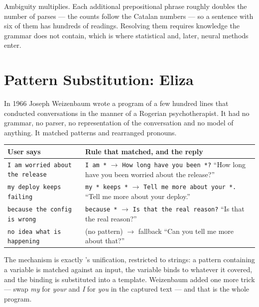 Ambiguity multiplies. Each additional prepositional phrase roughly doubles the
number of parses --- the counts follow the Catalan numbers --- so a sentence with
six of them has hundreds of readings. Resolving them requires knowledge the grammar
does not contain, which is where statistical and, later, neural methods enter.

\section{Pattern Substitution: Eliza}
\label{sec:eliza}

In 1966 Joseph Weizenbaum wrote a program of a few hundred lines that conducted
conversations in the manner of a Rogerian psychotherapist. It had no grammar, no
parser, no representation of the conversation and no model of anything. It matched
patterns and rearranged pronouns.

\begin{examplebox}
\begin{tabular}{@{}L{6.6cm}L{8.2cm}@{}}
\toprule
\textbf{User says} & \textbf{Rule that matched, and the reply} \\
\midrule
\texttt{I am worried about the release} &
\texttt{I am *} $\to$ \texttt{How long have you been *?}\newline
``How long have you been worried about the release?'' \\
\texttt{my deploy keeps failing} &
\texttt{my * keeps *} $\to$ \texttt{Tell me more about your *.}\newline
``Tell me more about your deploy.'' \\
\texttt{because the config is wrong} &
\texttt{because *} $\to$ \texttt{Is that the real reason?}\newline
``Is that the real reason?'' \\
\texttt{no idea what is happening} &
(no pattern) $\to$ fallback\newline
``Can you tell me more about that?'' \\
\bottomrule
\end{tabular}
\end{examplebox}

The mechanism is exactly 's unification, restricted to strings: a pattern
containing a variable is matched against an input, the variable binds to whatever
it covered, and the binding is substituted into a template. Weizenbaum added one
more trick --- swap \emph{my} for \emph{your} and \emph{I} for \emph{you} in the
captured text --- and that is the whole program.

